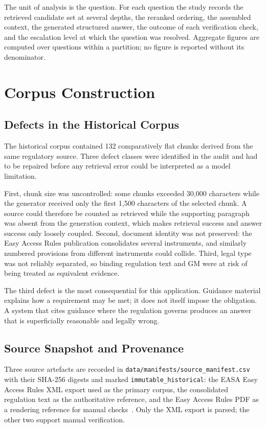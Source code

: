 The unit of analysis is the question. For each question the study records the retrieved candidate set at several depths, the reranked ordering, the assembled context, the generated structured answer, the outcome of each verification check, and the escalation level at which the question was resolved. Aggregate figures are computed over questions within a partition; no figure is reported without its denominator.

\section{Corpus Construction}
\label{sec:method-corpus}

\subsection{Defects in the Historical Corpus}

The historical corpus contained 132 comparatively flat chunks derived from the same regulatory source. Three defect classes were identified in the audit and had to be repaired before any retrieval error could be interpreted as a model limitation.

First, chunk size was uncontrolled: some chunks exceeded 30{,}000 characters while the generator received only the first 1{,}500 characters of the selected chunk. A source could therefore be counted as retrieved while the supporting paragraph was absent from the generation context, which makes retrieval success and answer success only loosely coupled. Second, document identity was not preserved: the Easy Access Rules publication consolidates several instruments, and similarly numbered provisions from different instruments could collide. Third, legal type was not reliably separated, so binding regulation text and \ac{GM} were at risk of being treated as equivalent evidence.

The third defect is the most consequential for this application. Guidance material explains how a requirement may be met; it does not itself impose the obligation. A system that cites guidance where the regulation governs produces an answer that is superficially reasonable and legally wrong.

\subsection{Source Snapshot and Provenance}

Three source artefacts are recorded in \texttt{data/manifests/source\_manifest.csv} with their SHA-256 digests and marked \texttt{immutable\_historical}: the \ac{EASA} Easy Access Rules XML export used as the primary corpus, the consolidated regulation text as the authoritative reference, and the Easy Access Rules PDF as a rendering reference for manual checks~\cite{eu2014reg376,easa2022easyaccess376}. Only the XML export is parsed; the other two support manual verification.

